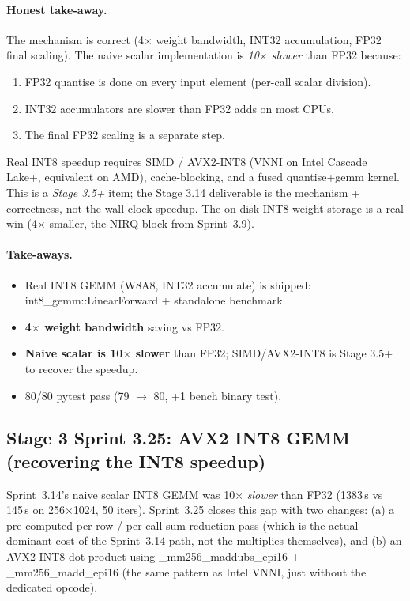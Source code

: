 \documentclass[10pt,twocolumn]{article}
\renewcommand{\texttt}[1]{{\normalfont\ttfamily #1}\normalfont\rmfamily}
\begin{document}
\paragraph{Honest take-away.}
The mechanism is correct (4$\times$ weight
bandwidth, INT32 accumulation, FP32 final
scaling).  The naive scalar implementation is
\emph{10$\times$ slower} than FP32 because:
\begin{enumerate}
\item FP32 quantise is done on every input element
(per-call scalar division).
\item INT32 accumulators are slower than FP32
adds on most CPUs.
\item The final FP32 scaling is a separate step.
\end{enumerate}
Real INT8 speedup requires SIMD / AVX2-INT8
(VNNI on Intel Cascade Lake+, equivalent on AMD),
cache-blocking, and a fused quantise+gemm kernel.
This is a \emph{Stage 3.5+} item; the Stage 3.14
deliverable is the mechanism + correctness, not
the wall-clock speedup.  The on-disk INT8 weight
storage is a real win (4$\times$ smaller, the
\texttt{NIRQ} block from Sprint~3.9).

\paragraph{Take-aways.}
\begin{itemize}
\item Real INT8 GEMM (W8A8, INT32 accumulate) is
shipped: \texttt{int8\_gemm::LinearForward} +
standalone benchmark.
\item \textbf{4$\times$ weight bandwidth} saving vs
FP32.
\item \textbf{Naive scalar is 10$\times$ slower}
than FP32; SIMD/AVX2-INT8 is Stage 3.5+ to
recover the speedup.
\item 80/80 pytest pass (79 $\to$ 80, +1 bench
binary test).
\end{itemize}

\subsection{Stage 3 Sprint 3.25: AVX2 INT8 GEMM (recovering the INT8 speedup)}
\label{sec:avx2-int8-gemm}

Sprint~3.14's naive scalar INT8 GEMM was 10$\times$
\emph{slower} than FP32 (1383\,\textmu s vs 145\,\textmu s
on 256$\times$1024, 50 iters).  Sprint~3.25 closes
this gap with two changes: (a) a pre-computed
per-row / per-call sum-reduction pass (which is
the actual dominant cost of the Sprint~3.14 path,
not the multiplies themselves), and (b) an AVX2
INT8 dot product using
\texttt{\_mm256\_maddubs\_epi16} +
\texttt{\_mm256\_madd\_epi16} (the same pattern
as Intel VNNI, just without the dedicated
opcode).
\end{document}
